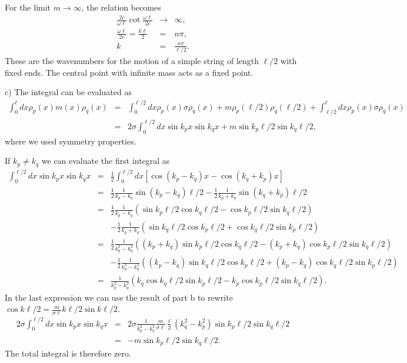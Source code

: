 \documentclass[letterpaper,11pt]{article}
\begin{document}
For the limit $m \to \infty$, the relation becomes
\begin{eqnarray*}
 \frac{2 c}{\omega \ell} \cot \frac{\omega \ell}{2 c} & \to & \infty, \\
 \frac{\omega \ell}{2 c} = \frac{k\ell}{2} & = & n \pi, \\
 k & = & \frac{n \pi}{\ell/2}.
\end{eqnarray*}
These are the wavenumbers for the motion of a simple string of length $\ell/2$ with fixed ends.  The central point with infinite mass acts as a fixed point.

c) The integral can be evaluated as
\begin{eqnarray*}
 \int_0^\ell dx \rho_p(x) m(x) \rho_q(x) & = & \int_0^{\ell/2} dx \rho_p(x) \sigma \rho_q(x) + m \rho_p(\ell/2) \rho_q(\ell/2) + \int_{\ell/2}^\ell dx \rho_p(x) \sigma \rho_q(x) \\
 & = & 2 \sigma \int_0^{\ell/2} dx \sin k_p x \sin k_q x + m \sin k_p \ell/2 \sin k_q \ell/2,
\end{eqnarray*}
where we used symmetry properties.

If $k_p \ne k_q$ we can evaluate the first integral as
\begin{eqnarray*}
 \int_0^{\ell/2} dx \sin k_p x \sin k_q x & = & \frac{1}{2} \int_0^{\ell/2} dx \left[ \cos (k_p - k_q) x - \cos (k_q + k_p) x \right] \\
 & = & \frac{1}{2} \frac{1}{k_p - k_q} \sin (k_p - k_q) \ell/2 - \frac{1}{2} \frac{1}{k_p + k_q} \sin (k_q + k_p) \ell/2 \\
 & = & \frac{1}{2} \frac{1}{k_p - k_q} \left( \sin k_p\ell/2 \cos k_q \ell/2 - \cos k_p\ell/2 \sin k_q \ell/2 \right) \\
 & & - \frac{1}{2} \frac{1}{k_p + k_q} \left( \sin k_q \ell/2 \cos k_p \ell/2 + \cos k_q \ell/2 \sin k_p \ell/2 \right) \\
 & = & \frac{1}{2} \frac{1}{k_p^2 - k_q^2} \left( (k_p + k_q) \sin k_p\ell/2 \cos k_q \ell/2 - (k_p + k_q) \cos k_p\ell/2 \sin k_q \ell/2 \right) \\
 & & - \frac{1}{2} \frac{1}{k_p^2 - k_q^2} \left( (k_p - k_q) \sin k_q \ell/2 \cos k_p \ell/2 + (k_p - k_q) \cos k_q \ell/2 \sin k_p \ell/2 \right) \\
 & = & \frac{1}{k_p^2 - k_q^2} \left( k_q \cos k_q \ell/2 \sin k_p \ell/2 - k_p \cos k_p \ell/2 \sin k_q \ell/2 \right).
\end{eqnarray*}
In the last expression we can use the result of part b to rewrite $\cos k\ell/2 = \frac{m}{\sigma\ell} k\ell/2 \sin k\ell/2$.
\begin{eqnarray*}
 2 \sigma \int_0^{\ell/2} dx \sin k_p x \sin k_q x & = & 2 \sigma \frac{1}{k_p^2 - k_q^2} \frac{m}{\sigma \ell} \frac{\ell}{2} (k_q^2 - k_p^2) \sin k_p \ell/2 \sin k_q \ell/2 \\
 & = & -m \sin k_p \ell/2 \sin k_q \ell/2.
\end{eqnarray*}
The total integral is therefore zero.
\end{document}
